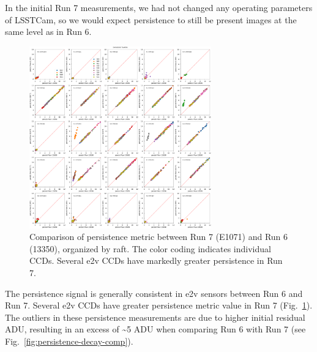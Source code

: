 In the initial Run 7 measurements, we had not changed any operating
parameters of LSSTCam, so we would expect persistence to still be
present images at the same level as in Run 6.

\begin{figure}[H]
\begin{centering}
\includegraphics[width=0.7\textwidth]{figures/baselineCharacterization/13550_E1071_persist_inset.png}
\caption{Comparison of persistence metric between Run 7 (E1071) and Run 6 (13350), organized by raft.  The color coding indicates individual CCDs.  Several e2v CCDs have markedly greater persistence in Run 7.}
\label{fig:persistence-comp}
\end{centering}
\end{figure}

The persistence signal is generally consistent in e2v sensors between Run 6 and Run 7. Several e2v CCDs have greater persistence metric value in Run 7 (Fig.~\ref{fig:persistence-comp}). The outliers in
these persistence measurements are due to higher initial residual ADU, resulting in an excess of \textasciitilde5 ADU when comparing Run 6 with Run 7 (see Fig.~\ref{fig:persistence-decay-comp}).


